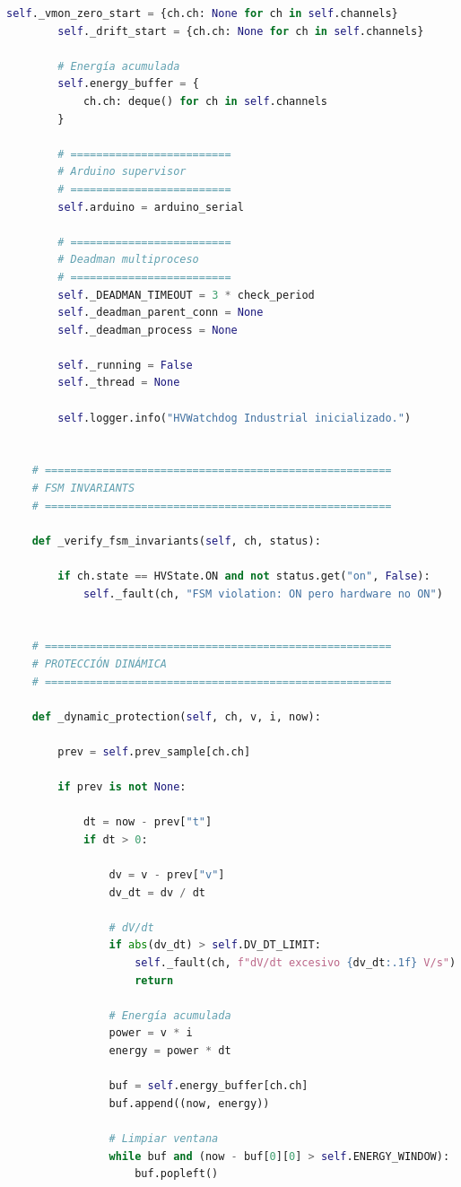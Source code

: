 \documentclass{article}
\begin{document}
\begin{lstlisting}[language=Python]
        self._vmon_zero_start = {ch.ch: None for ch in self.channels}
        self._drift_start = {ch.ch: None for ch in self.channels}

        # Energía acumulada
        self.energy_buffer = {
            ch.ch: deque() for ch in self.channels
        }

        # =========================
        # Arduino supervisor
        # =========================
        self.arduino = arduino_serial

        # =========================
        # Deadman multiproceso
        # =========================
        self._DEADMAN_TIMEOUT = 3 * check_period
        self._deadman_parent_conn = None
        self._deadman_process = None

        self._running = False
        self._thread = None

        self.logger.info("HVWatchdog Industrial inicializado.")


    # ======================================================
    # FSM INVARIANTS
    # ======================================================

    def _verify_fsm_invariants(self, ch, status):

        if ch.state == HVState.ON and not status.get("on", False):
            self._fault(ch, "FSM violation: ON pero hardware no ON")


    # ======================================================
    # PROTECCIÓN DINÁMICA
    # ======================================================

    def _dynamic_protection(self, ch, v, i, now):

        prev = self.prev_sample[ch.ch]

        if prev is not None:

            dt = now - prev["t"]
            if dt > 0:

                dv = v - prev["v"]
                dv_dt = dv / dt

                # dV/dt
                if abs(dv_dt) > self.DV_DT_LIMIT:
                    self._fault(ch, f"dV/dt excesivo {dv_dt:.1f} V/s")
                    return

                # Energía acumulada
                power = v * i
                energy = power * dt

                buf = self.energy_buffer[ch.ch]
                buf.append((now, energy))

                # Limpiar ventana
                while buf and (now - buf[0][0] > self.ENERGY_WINDOW):
                    buf.popleft()


\end{lstlisting}
\end{document}
